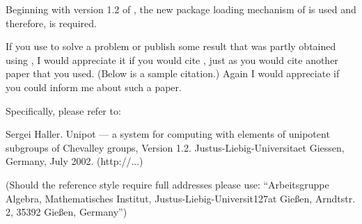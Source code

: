 Beginning with version 1.2 of \Unipot, the new package loading
mechanism of  is used and therefore,  is required.


% 



If you  use {\Unipot} to solve a problem or publish some  result
that was partly obtained  using {\Unipot}, I would appreciate it
if you would  cite {\Unipot},  just  as you  would  cite another
paper that you used. (Below is a sample citation.) Again I would
appreciate if you could inform me about such a paper.

Specifically, please refer to:
 
\begintt
[Hal02] Sergei Haller. Unipot --- a system for computing with elements
        of unipotent subgroups of Chevalley groups, Version 1.2.
        Justus-Liebig-Universitaet Giessen, Germany, July 2002. 
        (http://...)
\endtt
 
(Should the reference style require full addresses please use:
``Arbeitsgruppe Algebra,
  Mathematisches Institut,
  Justus-Liebig-Universit{\accent127a}t Gie{\ss}en,
  Arndtstr. 2,
  35392 Gie{\ss}en, Germany'')





